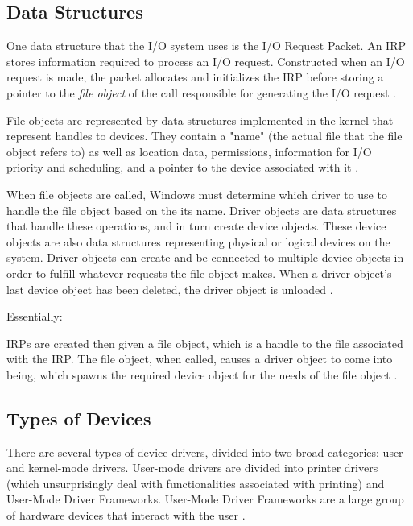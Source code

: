 \documentclass[10pt,draftclsnofoot,onecolumn,compsoc]{IEEEtran}
\begin{document}
	
	\subsection{Data Structures}
	
	One data structure that the I/O system uses is the I/O Request Packet. An IRP stores information required to process an I/O request. Constructed when an I/O request is made, the packet allocates and initializes the IRP before storing a pointer to the \textit{file object} of the call responsible for generating the I/O request \cite{WInternals}.
	
	File objects are represented by data structures implemented in the kernel that represent handles to devices. They contain a "name" (the actual file that the file object refers to) as well as location data, permissions, information for I/O priority and scheduling, and a pointer to the device associated with it \cite{WInternals}.
	
	When file objects are called, Windows must determine which driver to use to handle the file object based on the its name. Driver objects are data structures that handle these operations, and in turn create device objects. These device objects are also data structures representing physical or logical devices on the system. Driver objects can create and be connected to multiple device objects in order to fulfill whatever requests the file object makes. When a driver object's last device object has been deleted, the driver object is unloaded \cite{WInternals}.
	
	Essentially:
	
	IRPs are created then given a file object, which is a handle to the file associated with the IRP. The file object, when called, causes a driver object to come into being, which spawns the required device object for the needs of the file object \cite{WInternals}.
	
	\subsection{Types of Devices}
	
	There are several types of device drivers, divided into two broad categories: user- and kernel-mode drivers. User-mode drivers are divided into printer drivers (which unsurprisingly deal with functionalities associated with printing) and User-Mode Driver Frameworks. User-Mode Driver Frameworks are a large group of hardware devices that interact with the user \cite{WInternals}.
	
\end{document}
